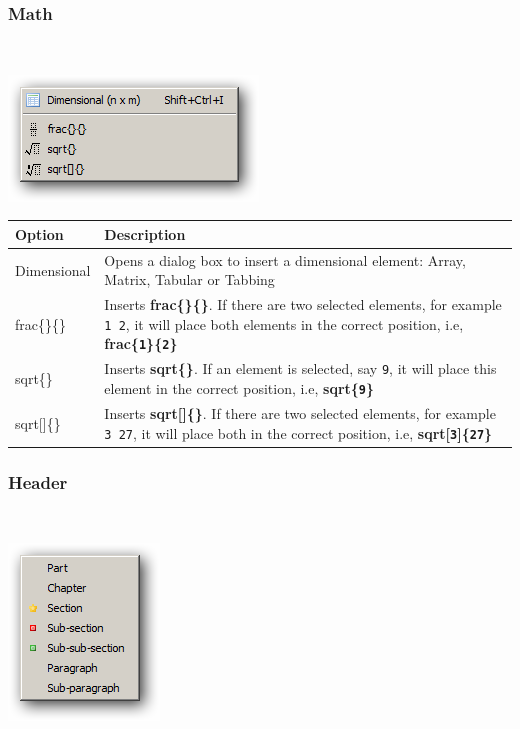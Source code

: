 \hypertarget{menu_insert_latex_math}{}
\subsubsection{Math}\\

\includegraphics[scale=0.50]{./res/menu_insert_latex_math.png}\\

\begin{scriptsize}\begin{tabularx}{\textwidth}{>{\hsize=0.2\hsize}X>{\hsize=0.8\hsize}X}\\
    \hline \textbf{Option} & \textbf{Description} \\
    \hline
    Dimensional & Opens a dialog box to insert a dimensional element: Array, Matrix, Tabular or Tabbing \\
    \hline
    frac\{\}\{\} & Inserts \textbf{frac\{\}\{\}}. If there are two selected elements, for example \texttt{1 2}, it will place both elements in the correct position, i.e, \textbf{frac\{\texttt{1}\}\{\texttt{2}\}} \\
    sqrt\{\} & Inserts \textbf{sqrt\{\}}. If an element is selected, say \texttt{9}, it will place this element in the correct position, i.e, \textbf{sqrt\{\texttt{9}\}} \\
    sqrt[]\{\} & Inserts \textbf{sqrt[]\{\}}. If there are two selected elements, for example \texttt{3 27}, it will place both in the correct position, i.e, \textbf{sqrt[\texttt{3}]\{\texttt{27}\}} \\
    \hline
  \end{tabularx}\end{scriptsize}


\hypertarget{menu_insert_latex_header}{}
\subsubsection{Header}\\

\includegraphics[scale=0.50]{./res/menu_insert_latex_header.png}\\

